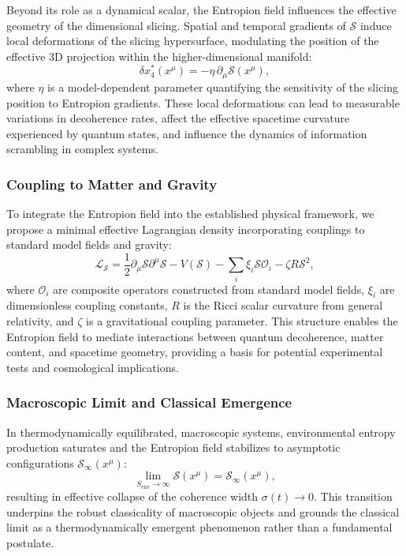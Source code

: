 \documentclass[12pt]{article}
\begin{document}
Beyond its role as a dynamical scalar, the Entropion field influences the effective geometry of the dimensional slicing. Spatial and temporal gradients of $\mathcal{S}$ induce local deformations of the slicing hypersurface, modulating the position of the effective 3D projection within the higher-dimensional manifold:
\begin{equation}
\delta x_4^*(x^\mu) = -\eta \, \partial_\mu \mathcal{S}(x^\mu),
\end{equation}
where $\eta$ is a model-dependent parameter quantifying the sensitivity of the slicing position to Entropion gradients. These local deformations can lead to measurable variations in decoherence rates, affect the effective spacetime curvature experienced by quantum states, and influence the dynamics of information scrambling in complex systems.

\subsubsection*{Coupling to Matter and Gravity}

To integrate the Entropion field into the established physical framework, we propose a minimal effective Lagrangian density incorporating couplings to standard model fields and gravity:
\begin{equation}
\mathcal{L}_\mathcal{S} = \frac{1}{2} \partial_\mu \mathcal{S} \partial^\mu \mathcal{S} - V(\mathcal{S}) - \sum_i \xi_i \mathcal{S} \mathcal{O}_i - \zeta R \mathcal{S}^2,
\end{equation}
where $\mathcal{O}_i$ are composite operators constructed from standard model fields, $\xi_i$ are dimensionless coupling constants, $R$ is the Ricci scalar curvature from general relativity, and $\zeta$ is a gravitational coupling parameter. This structure enables the Entropion field to mediate interactions between quantum decoherence, matter content, and spacetime geometry, providing a basis for potential experimental tests and cosmological implications.

\subsubsection*{Macroscopic Limit and Classical Emergence}

In thermodynamically equilibrated, macroscopic systems, environmental entropy production saturates and the Entropion field stabilizes to asymptotic configurations $\mathcal{S}_\infty(x^\mu)$:
\begin{equation}
\lim_{S_{\mathrm{env}} \to \infty} \mathcal{S}(x^\mu) = \mathcal{S}_\infty(x^\mu),
\end{equation}
resulting in effective collapse of the coherence width $\sigma(t) \to 0$. This transition underpins the robust classicality of macroscopic objects and grounds the classical limit as a thermodynamically emergent phenomenon rather than a fundamental postulate.
\end{document}
